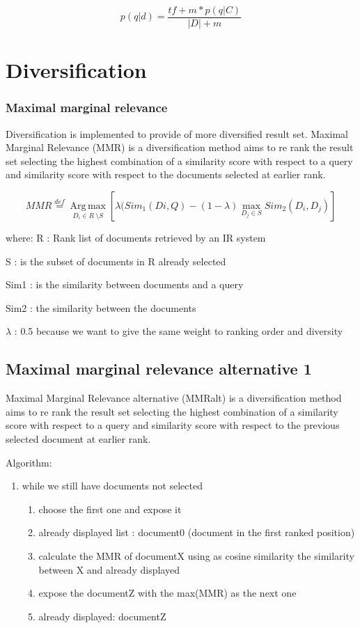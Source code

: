 \begin{equation}
p(q|d) =\frac{tf + m * p(q|C) }{|D| + m}
\end{equation}


\section{Diversification}

\subsubsection{Maximal marginal relevance}
Diversification is implemented to provide of more diversified result set. Maximal Marginal Relevance (MMR) is a diversification method aims to re rank the result set selecting the highest combination of a similarity score with respect to a query and similarity score with respect to the documents selected at earlier rank.


\begin{equation}
MMR\overset{def}{=}\operatorname*{Arg\, \max}_{D_{i} \in R\ \setminus S}[\lambda(Sim_{1}(Di,Q)-(1-\lambda)\underset{{D_{j}\in S}}{\max}Sim_{2}(D_{i},D_{j})]
\end{equation}

where:
R : Rank list of documents retrieved by an IR system

S : is the subset of documents in R already selected

Sim1 : is the similarity between documents and a query

Sim2 : the similarity between the documents

$\lambda$ : 0.5 because we want to give the same weight to ranking order and diversity


\subsection{Maximal marginal relevance alternative 1}


Maximal Marginal Relevance alternative (MMRalt) is a diversification method aims to re rank the result set selecting the highest combination of a similarity score with respect to a query and similarity score with respect to the previous selected document at earlier rank.


Algorithm:

\begin{enumerate}
\item while we still have documents not selected
	\begin{enumerate}
	\item choose the first one and expose it
	\item already displayed list : document0 (document in the first ranked position)
	\item calculate the MMR of documentX using as cosine similarity the similarity between X and already displayed
	\item expose the documentZ with the max(MMR) as the next one
	\item already displayed: documentZ
	\end{enumerate}
\end{enumerate}


